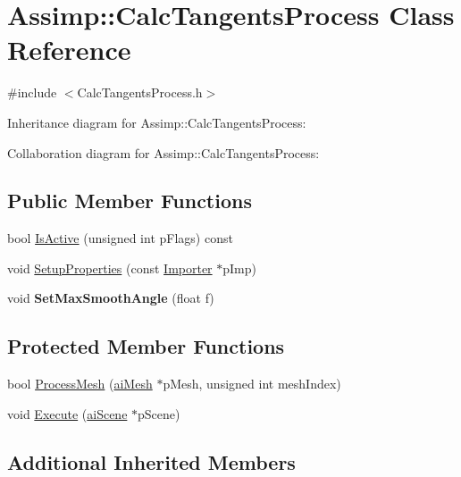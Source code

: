 \hypertarget{class_assimp_1_1_calc_tangents_process}{\section{Assimp\+:\+:Calc\+Tangents\+Process Class Reference}
\label{class_assimp_1_1_calc_tangents_process}
}


{\ttfamily \#include $<$Calc\+Tangents\+Process.\+h$>$}



Inheritance diagram for Assimp\+:\+:Calc\+Tangents\+Process\+:


Collaboration diagram for Assimp\+:\+:Calc\+Tangents\+Process\+:
\subsection*{Public Member Functions}
\begin{DoxyCompactItemize}
\item 
bool \hyperlink{class_assimp_1_1_calc_tangents_process_a22bc59ea98c8150c8957c7f49307f8df}{Is\+Active} (unsigned int p\+Flags) const 
\item 
void \hyperlink{class_assimp_1_1_calc_tangents_process_a3d68f84fd012e905337f863e1c354332}{Setup\+Properties} (const \hyperlink{class_assimp_1_1_importer}{Importer} $\ast$p\+Imp)
\item 
\hypertarget{class_assimp_1_1_calc_tangents_process_a727669a9ed36e571e36429987c952fa0}{void {\bfseries Set\+Max\+Smooth\+Angle} (float f)}\label{class_assimp_1_1_calc_tangents_process_a727669a9ed36e571e36429987c952fa0}

\end{DoxyCompactItemize}
\subsection*{Protected Member Functions}
\begin{DoxyCompactItemize}
\item 
bool \hyperlink{class_assimp_1_1_calc_tangents_process_a3bcd59a8133ee86b766684788aedaa35}{Process\+Mesh} (\hyperlink{structai_mesh}{ai\+Mesh} $\ast$p\+Mesh, unsigned int mesh\+Index)
\item 
void \hyperlink{class_assimp_1_1_calc_tangents_process_a7690fb9d5e89cbfe638bbb0d323e9445}{Execute} (\hyperlink{structai_scene}{ai\+Scene} $\ast$p\+Scene)
\end{DoxyCompactItemize}
\subsection*{Additional Inherited Members}


